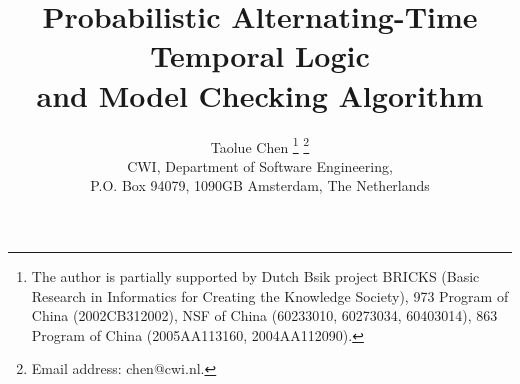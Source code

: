 \documentclass[times, 10 pt,twocolumn]{article}
\begin{document}
\title{Probabilistic Alternating-Time Temporal Logic \\
and Model Checking Algorithm}

\author{Taolue Chen \thanks{The author is partially
supported by Dutch Bsik project BRICKS (Basic Research in
Informatics for Creating the Knowledge Society), 973 Program of
China (2002CB312002), NSF of China (60233010, 60273034, 60403014),
863 Program of China (2005AA113160, 2004AA112090).} \thanks{%
Email address: chen@cwi.nl.} \\
CWI, Department of Software Engineering, \\ P.O. Box 94079, 1090GB
Amsterdam, The Netherlands %
}


\maketitle \thispagestyle{empty}

\end{document}

